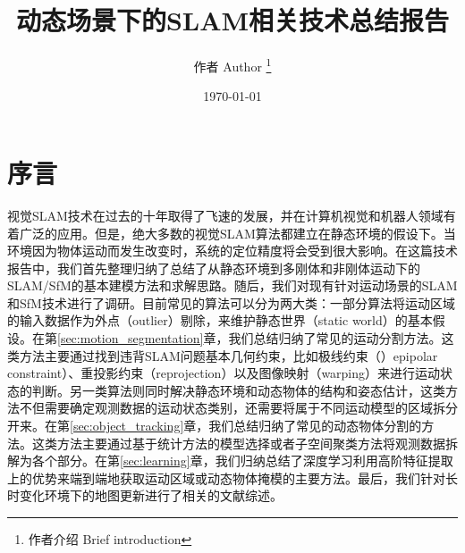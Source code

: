 \documentclass[12pt,a4paper]{article}
\title{动态场景下的SLAM相关技术总结报告}
\author{ 作者 Author \thanks{作者介绍 Brief introduction} }
\date{\today}
\begin{document}

\maketitle
\section{序言}
\label{sec:preliminaries}
视觉SLAM技术在过去的十年取得了飞速的发展，并在计算机视觉和机器人领域有着广泛的应用。但是，绝大多数的视觉SLAM算法都建立在静态环境的假设下。当环境因为物体运动而发生改变时，系统的定位精度将会受到很大影响。在这篇技术报告中，我们首先整理归纳了总结了从静态环境到多刚体和非刚体运动下的SLAM/SfM的基本建模方法和求解思路。随后，我们对现有针对运动场景的SLAM和SfM技术进行了调研。目前常见的算法可以分为两大类：一部分算法将运动区域的输入数据作为外点（outlier）剔除，来维护静态世界（static world）的基本假设。在第\ref{sec:motion_segmentation}章，我们总结归纳了常见的运动分割方法。这类方法主要通过找到违背SLAM问题基本几何约束，比如极线约束（）epipolar constraint）、重投影约束（reprojection）以及图像映射（warping）来进行运动状态的判断。另一类算法则同时解决静态环境和动态物体的结构和姿态估计，这类方法不但需要确定观测数据的运动状态类别，还需要将属于不同运动模型的区域拆分开来。在第\ref{sec:object_tracking}章，我们总结归纳了常见的动态物体分割的方法。这类方法主要通过基于统计方法的模型选择或者子空间聚类方法将观测数据拆解为各个部分。在第\ref{sec:learning}章，我们归纳总结了深度学习利用高阶特征提取上的优势来端到端地获取运动区域或动态物体掩模的主要方法。最后，我们针对长时变化环境下的地图更新进行了相关的文献综述。
%
%
%
%


%
%
%



	
\end{document}
